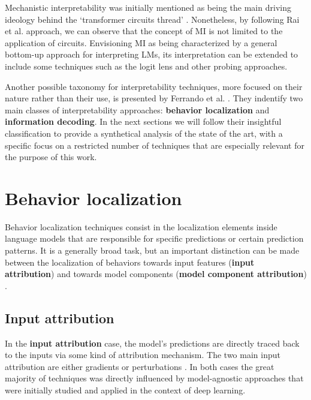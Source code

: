 Mechanistic interpretability was initially mentioned as being the main driving ideology behind the `transformer circuits thread' .
Nonetheless, by following Rai et al.  approach, we can observe that the concept of MI is not limited to the application of circuits.
Envisioning MI as being characterized by a general bottom-up approach for interpreting LMs, its interpretation can be extended to include some  techniques such as the logit lens  and other probing approaches.

Another possible taxonomy for interpretability techniques, more focused on their nature rather than their use, is presented by Ferrando et al. .
They indentify two main classes of interpretability approaches: \textbf{behavior localization} and \textbf{information decoding}.
In the next sections we will follow their insightful classification to provide a synthetical analysis of the state of the art, with a specific focus on a restricted number of techniques that are especially relevant for the purpose of this work.

\section{Behavior localization}

Behavior localization techniques consist in the localization elements inside language models that are responsible for specific predictions or certain prediction patterns.
It is a generally broad task, but an important distinction can be made between the localization of behaviors towards input features (\textbf{input attribution}) and towards model components (\textbf{model component attribution}) . 

\subsection{Input attribution}

In the \textbf{input attribution} case, the model's predictions are directly traced back to the inputs via some kind of attribution mechanism.
The two main input attribution  are either gradients  or perturbations .
In both cases the great majority of techniques was directly influenced by model-agnostic approaches  that were initially studied and applied in the context of deep learning.

